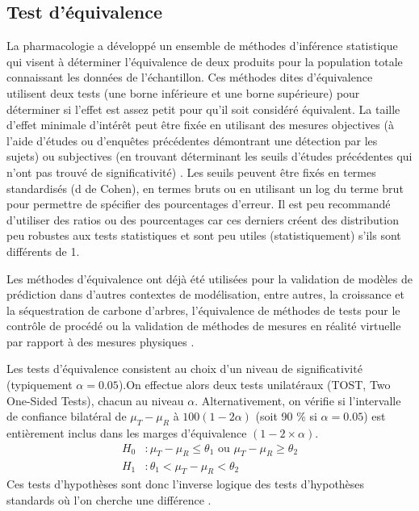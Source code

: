     \subsection{Test d'équivalence}
        La pharmacologie a développé un ensemble de méthodes d'inférence statistique qui visent à déterminer l'équivalence de deux produits \parencite{schuirmann_comparison_1987,lakens_equivalence_2018} pour la population totale connaissant les données de l'échantillon. Ces méthodes dites d'équivalence utilisent deux tests (une borne inférieure et une borne supérieure) pour déterminer si l'effet est assez petit pour qu'il soit considéré équivalent. La taille d'effet minimale d'intérêt peut être fixée en utilisant des mesures objectives (à l'aide d'études ou d'enquêtes précédentes démontrant une détection par les sujets) ou subjectives (en trouvant déterminant les seuils d'études précédentes qui n'ont pas trouvé de significativité) \parencite{lakens_equivalence_2018}. Les seuils peuvent être fixés en termes standardisés (d de Cohen), en termes bruts ou en utilisant un log du terme brut pour permettre de spécifier des pourcentages d'erreur. Il est peu recommandé d'utiliser des ratios ou des pourcentages car ces derniers créent des distribution peu robustes aux tests statistiques \parencite{jasienski_fallacy_1999,curran-everett_explorations_2013} et sont peu utiles (statistiquement) s'ils sont différents de 1.\par
        Les méthodes d'équivalence ont déjà été utilisées pour la validation de modèles de prédiction dans d'autres contextes de modélisation, entre autres, la croissance et la séquestration de carbone d'arbres\parencite{robinson_model_2004,herbert_validation_2023}, l'équivalence de méthodes de tests pour le contrôle de procédé \parencite{manola_probability_2019} ou la validation de méthodes de mesures en réalité virtuelle par rapport à des mesures physiques \parencite{anik_accuracy_2020} .\par
        Les tests d'équivalence consistent au choix d'un niveau de significativité (typiquement $\alpha = 0.05$).On effectue alors deux tests unilatéraux (TOST, Two One-Sided Tests), chacun au niveau $\alpha$. Alternativement, on vérifie si l'intervalle de confiance bilatéral de $\mu_T - \mu_R $ à $100(1-2\alpha)$ (soit 90 \% si $\alpha=0.05$) est entièrement inclus dans les marges d'équivalence $(1-2\times \alpha)$.
        \begin{align}
            H_0 &:\mu_T - \mu_R \leq \theta_1 \text{ ou } \mu_T - \mu_R \geq \theta_2\\
            H_1 &:\theta_1 <\mu_T - \mu_R <\theta_2
        \end{align}
        Ces tests d'hypothèses sont donc l'inverse logique des tests d'hypothèses standards où l'on cherche une différence \parencite{walker_understanding_2011}.
